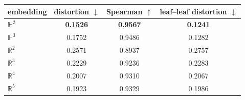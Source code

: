 \begin{tabular}{lccc}
\toprule
embedding & distortion $\downarrow$ & Spearman $\uparrow$ & leaf--leaf distortion $\downarrow$ \\
\midrule
$\mathbb{H}^2$ & \textbf{0.1526} & \textbf{0.9567} & \textbf{0.1241} \\
$\mathbb{H}^3$ & 0.1752 & 0.9486 & 0.1282 \\
$\mathbb{R}^2$ & 0.2571 & 0.8937 & 0.2757 \\
$\mathbb{R}^3$ & 0.2229 & 0.9236 & 0.2283 \\
$\mathbb{R}^4$ & 0.2007 & 0.9310 & 0.2067 \\
$\mathbb{R}^5$ & 0.1923 & 0.9329 & 0.1986 \\
\bottomrule
\end{tabular}
